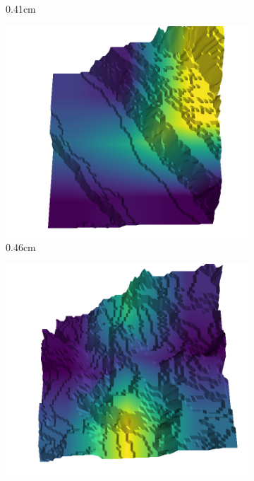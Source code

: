 \documentclass[../document.tex]{subfiles}
\begin{document}
\begin{figure}[H]
\begin{subfigure}[b]{0.192\linewidth}
    \caption{0.41cm}
    \label{fig : quarry-false_positive-17}
    \end{subfigure}
    \begin{subfigure}[b]{0.192\linewidth}
    \includegraphics[width=\linewidth]{../img/5/quarry/false_positive/46-patch-3d-majavi-colormap-216.png}
    \caption{0.46cm}
    \label{fig : quarry-false_positive-18}
    \end{subfigure}
    \begin{subfigure}[b]{0.192\linewidth}
    \includegraphics[width=\linewidth]{../img/5/quarry/false_positive/51-patch-3d-majavi-colormap-228.png}

\end{subfigure}
\end{figure}
\end{document}
